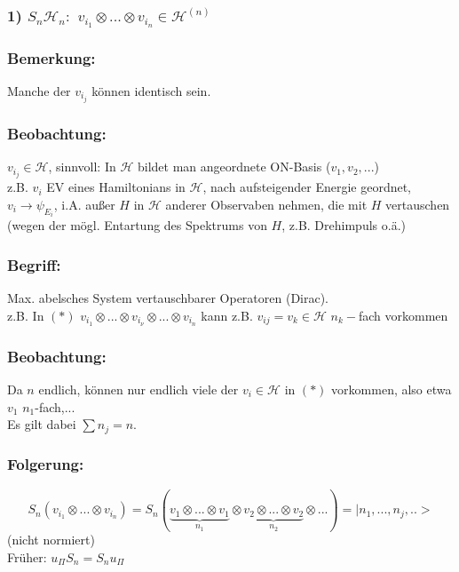 \documentclass[twoside,a4paper]{scrartcl}
\renewcommand{\1}{\mathds{1}}
\newcommand{\ra}{\rightarrow}
\renewcommand{\H}{\mathcal{H}}
\begin{document}
\subsubsection*{1) $S_n\H_n:$ $v_{i_1}\otimes ... \otimes v_{i_n}\in \H^{(n)}$} 
\subsubsection*{Bemerkung:} 
Manche der $v_{i_j}$ können identisch sein.
\subsubsection*{Beobachtung:} 
 $v_{i_j}\in \H$, sinnvoll: In $\H$ bildet man angeordnete ON-Basis ($v_1,v_2,...$)\\
z.B. $v_i$ EV eines Hamiltonians in $\H$, nach aufsteigender Energie geordnet, $v_i\ra \psi_{E_i}$, i.A. außer $H$ in $\H$ anderer Observaben nehmen, die mit $H$ vertauschen (wegen der mögl. Entartung des Spektrums von $H$, z.B. Drehimpuls o.ä.)
\subsubsection*{Begriff:} 
Max. abelsches System vertauschbarer Operatoren (Dirac).\\
z.B. In $(*)$ $v_{i_1}\otimes ... \otimes v_{i_\nu}\otimes ... \otimes v_{i_n}$ kann z.B. $v_{ij}=v_k \in \H$ $n_k-$fach vorkommen
\subsubsection*{Beobachtung:} 
Da $n$ endlich, können nur endlich viele der $v_i \in \H$ in $(*)$ vorkommen, also etwa $v_1$ $n_1$-fach,...\\
Es gilt dabei $\sum n_j=n$.
\subsubsection*{Folgerung:} 
$$S_n(v_{i_1}\otimes ... \otimes v_{i_n})=S_n (\underbrace {v_{1}\otimes ...\otimes v_{1}}_{n_1}\otimes \underbrace {v_{2}\otimes ...\otimes v_{2}}_{n_2}\otimes ...)=|n_1,...,n_j,..>$$
(nicht normiert)\\
Früher: $u_\Pi S_n= S_n u_\Pi$
\end{document}
